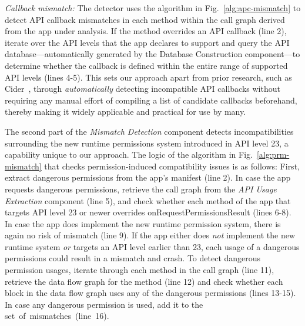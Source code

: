 \textit{Callback mismatch:} %
The detector uses the algorithm in Fig.~\ref{alg:apc-mismatch} to detect API callback mismatches in each method within the call graph derived from the app under analysis.
If the method overrides an API callback
(line 2), iterate over the API levels that the app declares to support and query
the API database---automatically generated by the Database Construction
component---to determine whether the callback is defined within the entire range
of supported API levels (lines 4-5). This sets our approach apart from prior
research, such as {\sc Cider}~\cite{wu2017measuring}, through
\emph{automatically} detecting incompatible API callbacks without requiring any
manual effort of compiling a list of candidate callbacks beforehand, thereby
making it widely applicable and practical for use by many.





The second part of the \textit{Mismatch Detection} component detects
incompatibilities surrounding the new runtime permissions system introduced in
API level 23, a capability unique to our approach. %
The logic of the algorithm in Fig.~\ref{alg:prm-mismatch} that checks permission-induced compatibility issues is as follows:
First, extract dangerous permissions from the app's manifest (line 2).  
In case the app
requests dangerous permissions, retrieve the call graph from the \textit{API Usage
Extraction} component (line 5), and check whether each method of the app that
targets API level 23 or newer overrides {\sf onRequestPermissionsResult} (lines
6-8). In case the app does implement the new runtime permission system, there
is again no risk of mismatch (line 9).  If the app either does \emph{not} implement
the new runtime system \emph{or} targets an API level earlier than
23, each usage of a dangerous permissions could result in a mismatch and crash.
To detect dangerous permission usages, iterate through each method in the call
graph (line 11), retrieve the data flow graph for the method (line 12) and check
whether each block in the data flow graph uses any of the dangerous permissions
(lines 13-15). In case any dangerous permission is used, add it to the
set~of~mismatches~(line~16).




\begin{figure}[t]
        
        \vspace{-3ex}
\end{figure}



